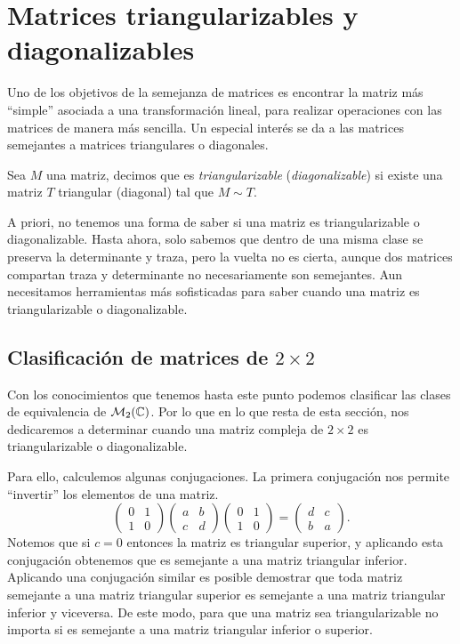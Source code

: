 \section{Matrices triangularizables y diagonalizables}

Uno de los objetivos de la semejanza de matrices es encontrar la matriz más ``simple'' asociada a una transformación lineal, para realizar operaciones con las matrices de manera más sencilla. Un especial interés se da a las matrices semejantes a matrices triangulares o diagonales.

\begin{defi}
  Sea $M$ una matriz, decimos que es \emph{triangularizable} (\emph{diagonalizable}) si existe una matriz $T$ triangular (diagonal) tal que $M \sim T$.
\end{defi}

A priori, no tenemos una forma de saber si una matriz es triangularizable o diagonalizable. Hasta ahora, solo sabemos que dentro de una misma clase se preserva la determinante y traza, pero la vuelta no es cierta, aunque dos matrices compartan traza y determinante no necesariamente son semejantes. Aun necesitamos herramientas más sofisticadas para saber cuando una matriz es triangularizable o diagonalizable.

\subsection{Clasificación de matrices de \texorpdfstring{$2\times 2$}{2x2}}

Con los conocimientos que tenemos hasta este punto podemos clasificar las clases de equivalencia de $\mathcal{M}_2(\mathbb{C})$. Por lo que en lo que resta de esta sección, nos dedicaremos a determinar cuando una matriz compleja de $2\times 2$ es triangularizable o diagonalizable.

Para ello, calculemos algunas conjugaciones. La primera conjugación nos permite ``invertir'' los elementos de una matriz.
\begin{equation}
  \begin{pmatrix} 0 & 1 \\ 1 & 0 \end{pmatrix}
  \begin{pmatrix} a & b \\ c & d \end{pmatrix}
  \begin{pmatrix} 0 & 1 \\ 1 & 0 \end{pmatrix}
    = \begin{pmatrix} d & c \\ b & a \end{pmatrix}. \label{eq:ConjI}
\end{equation}
Notemos que si $c = 0$ entonces la matriz es triangular superior, y aplicando esta conjugación obtenemos que es semejante a una matriz triangular inferior. Aplicando una conjugación similar es posible demostrar que toda matriz semejante a una matriz triangular superior es semejante a una matriz triangular inferior y viceversa. De este modo, para que una matriz sea triangularizable no importa si es semejante a una matriz triangular inferior o superior.

